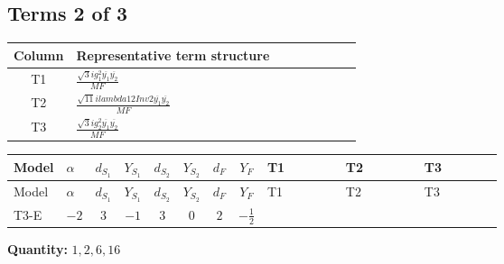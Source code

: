 \documentclass[8pt]{article}
\begin{document}
\begin{landscape}
\subsection*{Terms 2 of 3}
\begin{center}
\begin{tabular}{@{}c >{\raggedright\arraybackslash}p{0.82\linewidth}@{}}
\toprule
Column & Representative term structure \\
\midrule
T1 & \(\displaystyle \frac{\sqrt{3} i g_{1}^{2} \overline{y_{1}} \overline{y_{2}}}{MF}\) \\
\midrule
T2 & \(\displaystyle \frac{\sqrt{11} i lambda12Inv2 \overline{y_{1}} \overline{y_{2}}}{MF}\) \\
\midrule
T3 & \(\displaystyle \frac{\sqrt{3} i g_{2}^{2} \overline{y_{1}} \overline{y_{2}}}{MF}\) \\
\midrule
\bottomrule
\end{tabular}
\end{center}
\smallskip
\tiny
\begin{longtable}{@{}llcccccc >{\raggedright\arraybackslash}p{0.21\linewidth} >{\raggedright\arraybackslash}p{0.21\linewidth} >{\raggedright\arraybackslash}p{0.21\linewidth}@{}}
\toprule
Model & $\alpha$ & $d_{S_1}$ & $Y_{S_1}$ & $d_{S_2}$ & $Y_{S_2}$ & $d_F$ & $Y_F$ & T1 & T2 & T3 \\
\midrule
\endfirsthead
\toprule
Model & $\alpha$ & $d_{S_1}$ & $Y_{S_1}$ & $d_{S_2}$ & $Y_{S_2}$ & $d_F$ & $Y_F$ & T1 & T2 & T3 \\
\midrule
\endhead
T3-E & $-2$ & $3$ & $-1$ & $3$ & $0$ & $2$ & $-\frac{1}{2}$ & \scriptsize\adjustbox{max width=\linewidth}{$\begin{gathered} \frac{\sqrt{3} i g_{1}^{2} \overline{y_{1}} \overline{y_{2}}}{8 MF}\end{gathered}$} & \scriptsize\adjustbox{max width=\linewidth}{$\begin{gathered} \frac{3 \sqrt{11} i lambda12Inv2 \overline{y_{1}} \overline{y_{2}}}{22 MF}\end{gathered}$} & \scriptsize\adjustbox{max width=\linewidth}{$\begin{gathered} \frac{15 \sqrt{3} i g_{2}^{2} \overline{y_{1}} \overline{y_{2}}}{8 MF}\end{gathered}$} \\
\midrule
\bottomrule
\end{longtable}
\clearpage
\noindent\textbf{Quantity: }$\mathrm{1,2,6,16}$\par\smallskip

\end{landscape}
\end{document}
